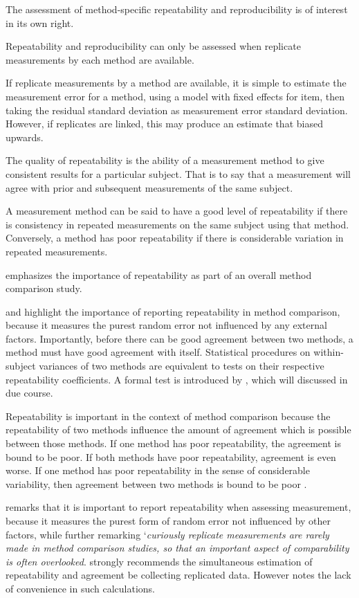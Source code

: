 \documentclass[12pt, a4paper]{report}
\theoremstyle{plain}
\theoremstyle{definition}
\theoremstyle{remark}
\begin{document}
The assessment of method-specific repeatability and reproducibility is of interest in its own right.

Repeatability and reproducibility can only be assessed when replicate measurements by each method are available.

If replicate measurements by a method are available, it is simple to estimate the measurement error for a method, using a model with fixed effects for item, then taking the residual standard deviation as measurement error standard deviation. However, if replicates are linked, this may produce an estimate that biased upwards.


The quality of repeatability is the ability of a measurement method to give consistent results for a particular subject. That is to say that a measurement will agree with prior and subsequent measurements of the same subject.

	A measurement method can be said to have a good level of repeatability if there is consistency in repeated measurements on the same subject using that method. Conversely, a method has poor repeatability if there is considerable variation in repeated measurements.
			
\citet{Barnhart} emphasizes the importance of repeatability as part of an overall method comparison study.
	
	\citet{Barnhart} and \citet{ARoy2009} highlight the importance of reporting repeatability in method comparison, because it measures the purest random error not influenced by any external factors. Importantly, before there can be good agreement between two methods, a method must have good agreement with itself.  Statistical procedures on within-subject variances of two methods are equivalent to tests on their respective repeatability coefficients. A formal test is introduced by \citet{ARoy2009}, which will discussed in due course.
	
	
	Repeatability is important in the context of method comparison because the repeatability of two methods influence the amount of agreement which is possible between those methods. If one method has poor repeatability, the agreement is bound to be poor. If both methods have poor repeatability, agreement is even worse. If one method has poor repeatability in the sense of considerable variability, then agreement between two methods is bound to be poor \citep{ARoy2009}.
	
		\citet{Barnhart} remarks that it is important to report repeatability when assessing
		measurement, because it measures the purest form of random error
		not influenced by other factors, while further remarking `\textit{curiously replicate measurements are rarely made in method comparison studies, so that an important aspect of comparability is often overlooked}. \citet{BA99} strongly recommends the simultaneous estimation of repeatability and agreement be collecting replicated data.
		However \citet{ARoy2009} notes the lack of convenience in such calculations. 	
		
\end{document}
